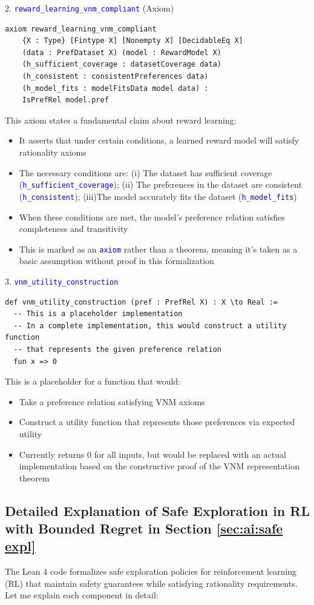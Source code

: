 \documentclass{article}
\theoremstyle{definition}
\newcommand{\tactic}[1]{\textcolor{blue}{\texttt{#1}}}
\begin{document}
2. \tactic{reward\_learning\_vnm\_compliant} (Axiom)
\begin{lstlisting}
axiom reward_learning_vnm_compliant
    {X : Type} [Fintype X] [Nonempty X] [DecidableEq X]
    (data : PrefDataset X) (model : RewardModel X)
    (h_sufficient_coverage : datasetCoverage data)
    (h_consistent : consistentPreferences data)
    (h_model_fits : modelFitsData model data) :
    IsPrefRel model.pref
\end{lstlisting}
This axiom states a fundamental claim about reward learning:
\begin{itemize}
  \item It asserts that under certain conditions, a learned reward model will satisfy rationality axioms
  \item The necessary conditions are: (i) The dataset has sufficient coverage (\tactic{h\_sufficient\_coverage}); (ii) The preferences in the dataset are consistent (\tactic{h\_consistent}); (iii)The model accurately fits the dataset (\tactic{h\_model\_fits})
  \item When these conditions are met, the model's preference relation satisfies completeness and transitivity
  \item This is marked as an \tactic{axiom} rather than a theorem, meaning it's taken as a basic assumption without proof in this formalization
\end{itemize}

3. \tactic{vnm\_utility\_construction}
\begin{lstlisting}
def vnm_utility_construction (pref : PrefRel X) : X \to Real :=
  -- This is a placeholder implementation
  -- In a complete implementation, this would construct a utility function
  -- that represents the given preference relation
  fun x => 0
\end{lstlisting}
This is a placeholder for a function that would:
\begin{itemize}
  \item Take a preference relation satisfying VNM axioms
  \item Construct a utility function that represents those preferences via expected utility
  \item Currently returns 0 for all inputs, but would be replaced with an actual implementation based on the constructive proof of the VNM representation theorem
\end{itemize}

\subsection{Detailed Explanation of Safe Exploration in RL with Bounded Regret in Section \ref{sec:ai:safe expl}}\label{explan:sec:ai:safe expl}
The Lean 4 code formalizes safe exploration policies for reinforcement learning (RL) that maintain safety guarantees while satisfying rationality requirements. Let me explain each component in detail:
\end{document}
